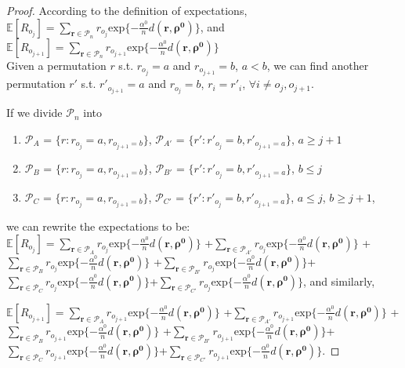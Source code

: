 \documentclass[11pt, oneside]{article}   	%
\begin{document}
\begin{proof}
According to the definition of expectations, \\
$\mathbb{E}[R_{o_j}] = \sum\limits_{\bm{r}\in \mathcal{P}_n} r_{o_j}\text{exp}\{-\frac{\alpha^0}{n}d(\bm{r}, \bm{\rho^0})\}$, and  $\mathbb{E}[R_{o_{j+1}}] = \sum\limits_{\bm{r}\in \mathcal{P}_n} r_{o_{j+1}}\text{exp}\{-\frac{\alpha^0}{n}d(\bm{r}, \bm{\rho^0})\}$ \\
Given a permutation $r$ s.t. $r_{o_j} = a$ and  $r_{o_{j+1}} = b$, $a<b$, we can find another permutation $r'$ s.t. $r'_{o_{j+1}} = a$ and  $r_{o_{j}} = b$, $r_i = r'_i$, $\forall i\neq o_j, o_{j+1}$.

If we divide $\mathcal{P}_n $ into
\begin{enumerate}
	\item{$\mathcal{P}_A$ = $\{r: r_{o_j} = a, r_{o_{j+1}=b}\}$, $\mathcal{P}_{A'}$ = $\{r': r'_{o_j} = b, r'_{o_{j+1}=a}\}$, $a\geq j+1$}
	
	\item{$\mathcal{P}_B$ = $\{r: r_{o_j} = a, r_{o_{j+1}=b}\}$, $\mathcal{P}_{B'}$ = $\{r': r'_{o_j} = b, r'_{o_{j+1}=a}\}$, $b\leq j$}
	
	\item{$\mathcal{P}_C$ = $\{r: r_{o_j} = a, r_{o_{j+1}=b}\}$, $\mathcal{P}_{C'}$ = $\{r': r'_{o_j} = b, r'_{o_{j+1}=a}\}$, $a\leq j$, $b\geq j+1$},
\end{enumerate}

we can rewrite the expectations to be: \\
$\mathbb{E}[R_{o_{j}}] = \sum\limits_{\bm{r}\in \mathcal{P}_A} r_{o_j}\text{exp}\{-\frac{\alpha^0}{n}d(\bm{r}, \bm{\rho^0})\}$ +$\sum\limits_{\bm{r}\in \mathcal{P}_{A'}} r_{o_j}\text{exp}\{-\frac{\alpha^0}{n}d(\bm{r}, \bm{\rho^0})\}$ +\\$\sum\limits_{\bm{r}\in \mathcal{P}_B} r_{o_j}\text{exp}\{-\frac{\alpha^0}{n}d(\bm{r}, \bm{\rho^0})\}$ +$\sum\limits_{\bm{r}\in \mathcal{P}_{B'}} r_{o_j}\text{exp}\{-\frac{\alpha^0}{n}d(\bm{r}, \bm{\rho^0})\}$+ \\$\sum\limits_{\bm{r}\in \mathcal{P}_C} r_{o_j}\text{exp}\{-\frac{\alpha^0}{n}d(\bm{r}, \bm{\rho^0})\}$+$\sum\limits_{\bm{r}\in \mathcal{P}_{C'}} r_{o_j}\text{exp}\{-\frac{\alpha^0}{n}d(\bm{r}, \bm{\rho^0})\}$, and similarly,

$\mathbb{E}[R_{o_{j+1}}] = \sum\limits_{\bm{r}\in \mathcal{P}_A} r_{o_{j+1}}\text{exp}\{-\frac{\alpha^0}{n}d(\bm{r}, \bm{\rho^0})\}$ +$\sum\limits_{\bm{r}\in \mathcal{P}_{A'}} r_{o_{j+1}}\text{exp}\{-\frac{\alpha^0}{n}d(\bm{r}, \bm{\rho^0})\}$ +\\$\sum\limits_{\bm{r}\in \mathcal{P}_B} r_{o_{j+1}}\text{exp}\{-\frac{\alpha^0}{n}d(\bm{r}, \bm{\rho^0})\}$ +$\sum\limits_{\bm{r}\in \mathcal{P}_{B'}} r_{o_{j+1}}\text{exp}\{-\frac{\alpha^0}{n}d(\bm{r}, \bm{\rho^0})\}$+ \\$\sum\limits_{\bm{r}\in \mathcal{P}_C} r_{o_{j+1}}\text{exp}\{-\frac{\alpha^0}{n}d(\bm{r}, \bm{\rho^0})\}$+$\sum\limits_{\bm{r}\in \mathcal{P}_{C'}} r_{o_{j+1}}\text{exp}\{-\frac{\alpha^0}{n}d(\bm{r}, \bm{\rho^0})\}$.


\end{proof}
\end{document}
